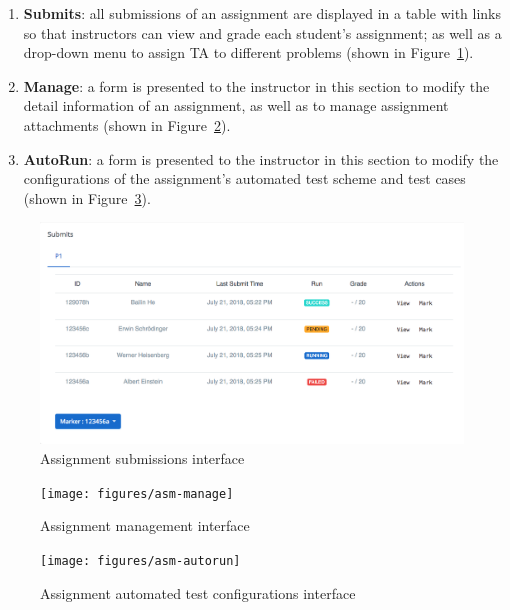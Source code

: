 \begin{enumerate}
    \item \textbf{Submits}: all submissions of an assignment are displayed
        in a table with links so that instructors can view and grade each
        student's assignment; as well as a drop-down menu to assign TA to
        different problems (shown in Figure~\ref{fig:ASM_SUBMITS}).
    \item \textbf{Manage}: a form is presented to the instructor in this section
        to modify the detail information of an assignment, as well as to
        manage assignment attachments (shown in Figure~\ref{fig:ASM_MANAGE}).
    \item \textbf{AutoRun}: a form is presented to the instructor in this
        section to modify the configurations of the assignment's automated
        test scheme and test cases (shown in Figure~\ref{fig:ASM_AUTORUN}).
\end{enumerate}

\begin{figure}[ht]
    \centering
        \includegraphics[width=1.0\textwidth]{figures/asm-submits}
    \caption{Assignment submissions interface}
    \label{fig:ASM_SUBMITS}
\end{figure}

\begin{figure}[ht]
    \centering
        \texttt{[image: figures/asm-manage]}
    \caption{Assignment management interface}
    \label{fig:ASM_MANAGE}
\end{figure}

\begin{figure}[ht]
    \centering
        \texttt{[image: figures/asm-autorun]}
    \caption{Assignment automated test configurations interface}
    \label{fig:ASM_AUTORUN}
\end{figure}
